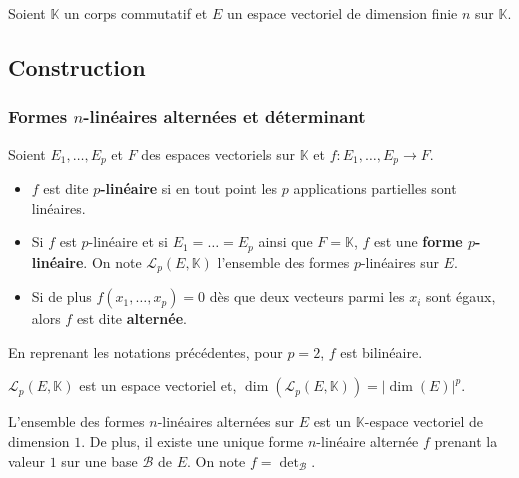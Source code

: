




  Soient $\mathbb{K}$ un corps commutatif et $E$ un espace vectoriel de dimension finie $n$ sur $\mathbb{K}$.

  \subsection{Construction}

  \subsubsection{Formes \texorpdfstring{$n$}{n}-linéaires alternées et déterminant}


  \begin{definition}
    Soient $E_1, \dots, E_p$ et $F$ des espaces vectoriels sur $\mathbb{K}$ et $f : E_1, \dots, E_p \rightarrow F$.
    \begin{itemize}
      \item $f$ est dite \textbf{$p$-linéaire} si en tout point les $p$ applications partielles sont linéaires.
      \item Si $f$ est $p$-linéaire et si $E_1 = \dots = E_p$ ainsi que $F = \mathbb{K}$, $f$ est une \textbf{forme $p$-linéaire}. On note $\mathcal{L}_p(E, \mathbb{K})$ l'ensemble des formes $p$-linéaires sur $E$.
      \item Si de plus $f(x_1, \dots, x_p) = 0$ dès que deux vecteurs parmi les $x_i$ sont égaux, alors $f$ est dite \textbf{alternée}.
    \end{itemize}
  \end{definition}

  \begin{example}
    En reprenant les notations précédentes, pour $p = 2$, $f$ est bilinéaire.
  \end{example}

  \begin{proposition}
    $\mathcal{L}_p(E, \mathbb{K})$ est un espace vectoriel et, $\operatorname{dim}(\mathcal{L}_p(E, \mathbb{K})) = |\operatorname{dim}(E)|^p$.
  \end{proposition}

  \begin{theorem}
    L'ensemble des formes $n$-linéaires alternées sur $E$ est un $\mathbb{K}$-espace vectoriel de dimension $1$. De plus, il existe une unique forme $n$-linéaire alternée $f$ prenant la valeur $1$ sur une base $\mathcal{B}$ de $E$. On note $f = \det_{\mathcal{B}}$.
  \end{theorem}

